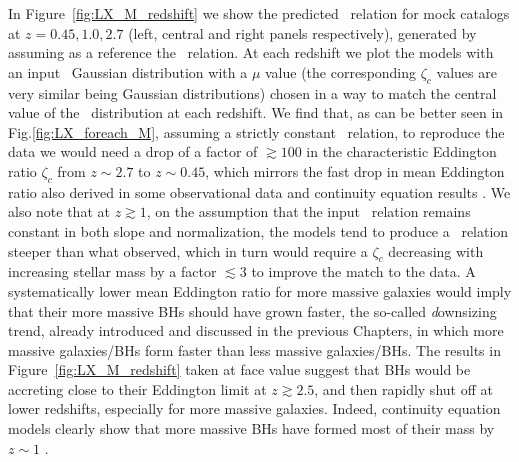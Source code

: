 In Figure~\ref{fig:LX_M_redshift} we show the predicted \LXMS\ relation for mock catalogs at $z=0.45,1.0,2.7$ (left, central and right panels respectively), generated by assuming as a reference the \citet{2015ApJ...813...82R} \MBHMS\ relation. 
At each redshift we plot the models with an input \PLz\ Gaussian distribution with a $\mu$ value (the corresponding $\zeta_c$ values are very similar being Gaussian distributions) chosen in a way to match the central value of the \LXMS\ distribution at each redshift.
We find that, as can be better seen in Fig.\ref{fig:LX_foreach_M}, assuming a strictly constant \MBHMS\ relation, to reproduce the data we would need a drop of a factor of $\gtrsim 100$ in the characteristic Eddington ratio $\zeta_c$ from $z\sim 2.7$ to $z\sim 0.45$, which mirrors the fast drop in mean Eddington ratio also derived in some observational data and continuity equation results \citep[see, e.g., Fig. 12 in][]{Shankar13Acc}. We also note that at $z \gtrsim 1$, on the assumption that the input \MBHMS\ relation remains constant in both slope and normalization, the models tend to produce a \LXMS\ relation steeper than what observed, which in turn would require a $\zeta_c$ decreasing with increasing stellar mass by a factor $\lesssim 3$ to improve the match to the data. A systematically lower mean Eddington ratio for more massive galaxies would imply that their more massive BHs should have grown faster, the so-called {\emph downsizing} trend, already introduced and discussed in the previous Chapters, in which more massive galaxies/BHs form faster than less massive galaxies/BHs. The results in Figure~\ref{fig:LX_M_redshift} taken at face value suggest that BHs would be accreting close to their Eddington limit at $z\gtrsim 2.5$, and then rapidly shut off at lower redshifts, especially for more massive galaxies. Indeed, continuity equation models clearly show that more massive BHs have formed most of their mass by $z\sim 1$ \citep[e.g.,][]{2004MNRAS.351..169M,2020MNRAS.493.1500S}.



